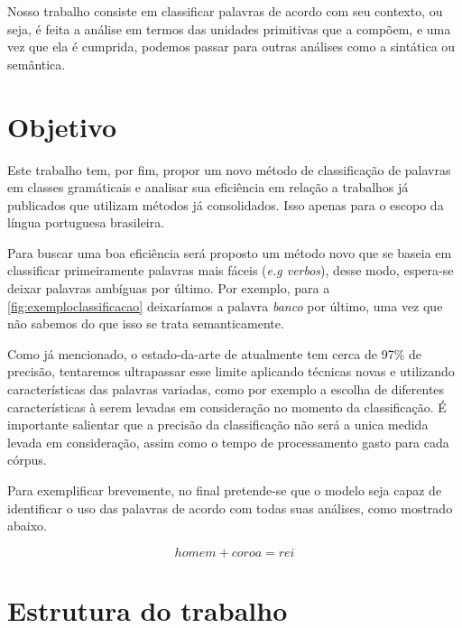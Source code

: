 Nosso trabalho consiste em classificar palavras de acordo com seu contexto, ou seja, é feita a análise em termos das unidades primitivas que a compõem, e uma vez que ela é cumprida, podemos passar para outras análises como a sintática ou semântica.


\section{Objetivo}\label{sec:objetivo}

Este trabalho tem, por fim, propor um novo método de classificação de palavras em classes gramáticais e analisar sua eficiência em relação a trabalhos já publicados que utilizam métodos já consolidados. Isso apenas para o escopo da língua portuguesa brasileira. 

Para buscar uma boa eficiência será proposto um método novo que se baseia em classificar primeiramente palavras mais fáceis (\textit{e.g verbos}), desse modo, espera-se deixar palavras ambíguas por último. Por exemplo, para a \autoref{fig:exemploclassificacao} deixaríamos a palavra \textit{banco} por último, uma vez que não sabemos do que isso se trata semanticamente.  

Como já mencionado, o estado-da-arte de atualmente tem cerca de 97\% de precisão, tentaremos ultrapassar esse limite aplicando técnicas novas e utilizando características das palavras variadas, como por exemplo a escolha de diferentes características à serem levadas em consideração no momento da classificação. É importante salientar que a precisão da classificação não será a unica medida levada em consideração, assim como o tempo de processamento gasto para cada córpus.

Para exemplificar brevemente, no final pretende-se que o modelo seja capaz de identificar o uso das palavras de acordo com todas suas análises, como mostrado abaixo.

\begin{equation}
homem + coroa = rei \label{eq:exemploobjetivo}
\end{equation}



\section{Estrutura do trabalho}\label{sec:estruturadotrabalho}


